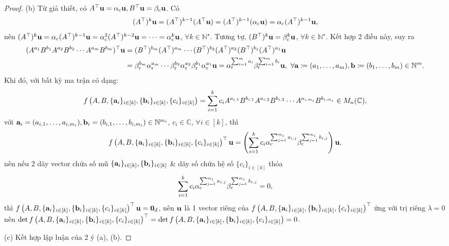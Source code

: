\documentclass{article}
\begin{document}
\begin{proof}
	\item(b) Từ giả thiết, có $A^\top{\bf u} = \alpha_{\rm c}{\bf u},B^\top{\bf u} = \beta_{\rm c}{\bf u}$. Có
	\begin{equation*}
		(A^\top)^k{\bf u} = (A^\top)^{k-1}(A^\top{\bf u}) = (A^\top)^{k-1}(\alpha_{\rm c}{\bf u}) = \alpha_{\rm c}(A^\top)^{k-1}{\bf u},
	\end{equation*}
	nên $(A^\top)^k{\bf u} = \alpha_{\rm c}(A^\top)^{k-1}{\bf u} = \alpha_{\rm c}^2(A^\top)^{k-2}{\bf u} = \cdots = \alpha_{\rm c}^k{\bf u}$, $\forall k\in\mathbb{N}^\star$. Tương tự, $(B^\top)^k{\bf u} = \beta_{\rm c}^k{\bf u}$, $\forall k\in\mathbb{N}^\star$. Kết hợp 2 điều này, suy ra
	\begin{align*}
		(A^{a_1}B^{b_1}A^{a_2}B^{b_2}\cdots A^{a_m}B^{b_m})^\top{\bf u} &= (B^\top)^{b_m} (A^\top)^{a_m}\cdots (B^\top)^{b_2}(A^\top)^{a_2}(B^\top)^{b_1}(A^\top)^{a_1}{\bf u}\\
		&= \beta_{\rm r}^{b_m}\alpha_{\rm r}^{a_m}\cdots\beta_{\rm r}^{b_2}\alpha_{\rm r}^{a_2}\beta_{\rm r}^{b_1}\alpha_{\rm r}^{a_1}{\bf u} = \alpha_{\rm r}^{\sum_{i=1}^m a_i}\beta_{\rm r}^{\sum_{i=1}^m b_i}{\bf u},\ \forall{\bf a}\coloneqq(a_1,\ldots,a_m),{\bf b}\coloneqq(b_1,\ldots,b_m)\in\mathbb{N}^m.
	\end{align*}
	Khi đó, với bất kỳ ma trận có dạng:
	\begin{equation*}
		f\left(A,B,\{{\bf a}_i\}_{i\in[k]},\{{\bf b}_i\}_{i\in[k]},\{c_i\}_{i\in[k]}\right) = \sum_{i=1}^k c_iA^{a_{i,1}}B^{b_{i,1}}A^{a_{i,2}}B^{b_{i,2}}\cdots A^{a_{i,m_i}}B^{b_{i,m_i}}\in M_n(\mathbb{C}),
	\end{equation*}
	với ${\bf a}_i = (a_{i,1},\ldots,a_{i,m_i}),{\bf b}_i = (b_{i,1},\ldots,b_{i,m_i})\in\mathbb{N}^{m_i}$, $c_i\in\mathbb{C}$, $\forall i\in[k]$, thì
	\begin{equation*}
		f\left(A,B,\{{\bf a}_i\}_{i\in[k]},\{{\bf b}_i\}_{i\in[k]},\{c_i\}_{i\in[k]}\right)^\top{\bf u} = \left(\sum_{i=1}^k c_i\alpha_{\rm c}^{\sum_{j=1}^{m_i} a_{i,j}}\beta_{\rm c}^{\sum_{j=1}^{m_i} b_{i,j}}\right){\bf u},
	\end{equation*}
	nên nếu 2 dãy vector chứa số mũ $\{{\bf a}_i\}_{i\in[k]},\{{\bf b}_i\}_{i\in[k]}$ \& dãy số chứa hệ số $\{c_i\}_{i\in[k]}$ thỏa
	\begin{equation*}
		\sum_{i=1}^k c_i\alpha_{\rm c}^{\sum_{j=1}^{m_i} a_{i,j}}\beta_{\rm c}^{\sum_{j=1}^{m_i} b_{i,j}} = 0,
	\end{equation*}
	thì $f\left(A,B,\{{\bf a}_i\}_{i\in[k]},\{{\bf b}_i\}_{i\in[k]},\{c_i\}_{i\in[k]}\right)^\top{\bf u} = {\bf0}_d$, nên ${\bf u}$ là 1 vector riêng của $f\left(A,B,\{{\bf a}_i\}_{i\in[k]},\{{\bf b}_i\}_{i\in[k]},\{c_i\}_{i\in[k]}\right)^\top$ ứng với trị riêng $\lambda = 0$ nên $\det f\left(A,B,\{{\bf a}_i\}_{i\in[k]},\{{\bf b}_i\}_{i\in[k]},\{c_i\}_{i\in[k]}\right)^\top = \det f\left(A,B,\{{\bf a}_i\}_{i\in[k]},\{{\bf b}_i\}_{i\in[k]},\{c_i\}_{i\in[k]}\right) = 0$.
	\item(c) Kết hợp lập luận của 2 ý (a), (b).
\end{proof}
\end{document}
